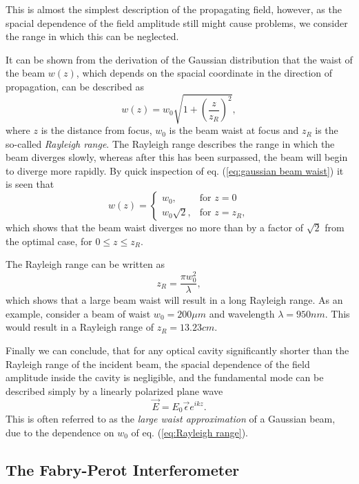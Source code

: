 This is almost the simplest description of the propagating field, however, as the spacial dependence of the field amplitude still might cause problems, we consider the range in which this can be neglected. 

It can be shown from the derivation of the Gaussian distribution that the waist of the beam $w(z)$, which depends on the spacial coordinate in the direction of propagation, can be described as \cite{Eichhorn}
\begin{equation}
    w(z) = w_0 \sqrt{1 + \left(\frac{z}{z_R}\right)^2},
    \label{eq:gaussian beam waist}
\end{equation}
where $z$ is the distance from focus, $w_0$ is the beam waist at focus and $z_R$ is the so-called \emph{Rayleigh range}. The Rayleigh range describes the range in which the beam diverges slowly, whereas after this has been surpassed, the beam will begin to diverge more rapidly. By quick inspection of eq. (\ref{eq:gaussian beam waist}) it is seen that
\begin{equation}
    w(z) = 
    \begin{cases}
        w_0, & \mbox{for } z=0 \\
        w_0\sqrt{2}, & \mbox{for } z=z_R,
    \end{cases}
\end{equation}
which shows that the beam waist diverges no more than by a factor of $\sqrt{2}$ from the optimal case, for $0\leq z \leq z_R$.

The Rayleigh range can be written as \cite{Pedrotti}
\begin{equation}
    z_R = \frac{\pi w_0^2}{\lambda},
    \label{eq:Rayleigh range}
\end{equation}
which shows that a large beam waist will result in a long Rayleigh range. As an example, consider a beam of waist $w_0 = 200 \mu m$ and wavelength $\lambda = 950 nm$. This would result in a Rayleigh range of $z_R=13.23 cm$. 

Finally we can conclude, that for any optical cavity significantly shorter than the Rayleigh range of the incident beam, the spacial dependence of the field amplitude inside the cavity is negligible, and the fundamental mode can be described simply by a linearly polarized plane wave
\begin{equation}
    \vec{E} = E_0 \vec{\epsilon} e^{ikz}.
\end{equation}
This is often referred to as the \emph{large waist approximation} of a Gaussian beam, due to the dependence on $w_0$ of eq. (\ref{eq:Rayleigh range}).



\subsection{The Fabry-Perot Interferometer}